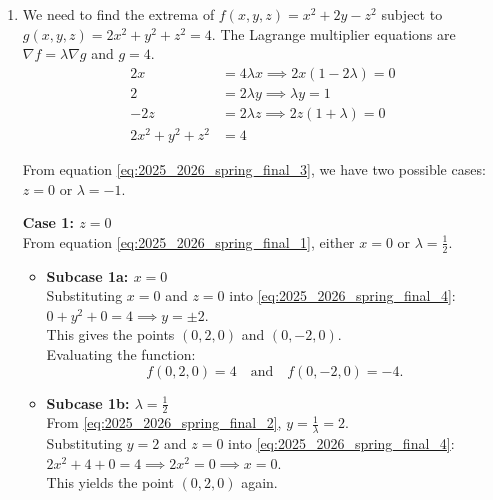\documentclass[a4paper, 12pt]{article}
\begin{document}
\newpage
{}
{}



\begin{enumerate}[leftmargin=*,label=\textbf{\arabic*.}]
\item We need to find the extrema of $f(x,y,z) = x^2 + 2y - z^2$ subject to $g(x,y,z) = 2x^2 + y^2 + z^2 = 4$.
The Lagrange multiplier equations are $\nabla f = \lambda \nabla g$ and $g = 4$.
\begin{align}
2x &= 4\lambda x \implies 2x(1 - 2\lambda) = 0 \label{eq:2025_2026_spring_final_1} \\
2 &= 2\lambda y \implies \lambda y = 1 \label{eq:2025_2026_spring_final_2} \\
-2z &= 2\lambda z \implies 2z(1 + \lambda) = 0 \label{eq:2025_2026_spring_final_3} \\
2x^2 + y^2 + z^2 &= 4 \label{eq:2025_2026_spring_final_4}
\end{align}

From equation \eqref{eq:2025_2026_spring_final_3}, we have two possible cases: $z = 0$ or $\lambda = -1$.

\textbf{Case 1: $z = 0$} \\
From equation  \eqref{eq:2025_2026_spring_final_1}, either $x = 0$ or $\lambda = \frac{1}{2}$.
\begin{itemize}
    \item \textbf{Subcase 1a: $x = 0$} \\
    Substituting $x = 0$ and $z = 0$ into \eqref{eq:2025_2026_spring_final_4}: $0 + y^2 + 0 = 4 \implies y = \pm 2$.\\
    This gives the points $(0, 2, 0)$ and $(0, -2, 0)$.\\
    Evaluating the function:
    \[
    f(0, 2, 0) = 4 \quad \text{and} \quad f(0, -2, 0) = -4.
    \]
    \item \textbf{Subcase 1b: $\lambda = \frac{1}{2}$} \\
    From \eqref{eq:2025_2026_spring_final_2}, $y = \frac{1}{\lambda} = 2$.\\
    Substituting $y = 2$ and $z = 0$ into \eqref{eq:2025_2026_spring_final_4}: $2x^2 + 4 + 0 = 4 \implies 2x^2 = 0 \implies x = 0$.\\
    This yields the point $(0, 2, 0)$ again.
\end{itemize}


\end{enumerate}
\end{document}
